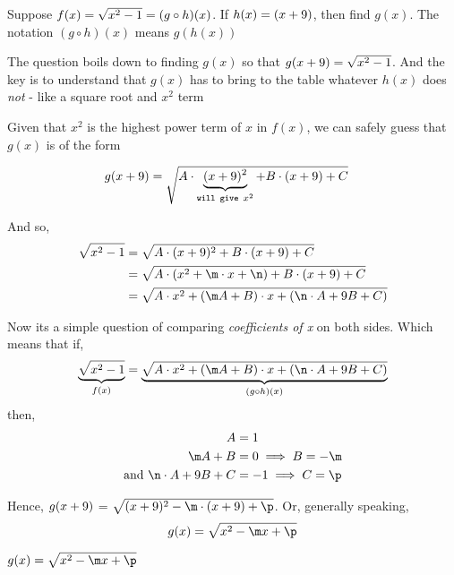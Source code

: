 



\SQUARE{\vb}{\n}
\EXPR[0]\p{-(\va - \n)}

\question[4] Suppose $f(x) = \sqrt{x^2 - 1} = (g \circ h)(x)$. If $h(x) = (x + 9)$, 
then find $g(x)$. The notation $(g\circ h)(x)$ means $g(h(x))$


\watchout

\ifprintanswers
\fi 

\begin{solution}[\halfpage]
	The question boils down to finding $g(x)$ so that $g(x+9) = \sqrt{x^2-1}$. And the key 
	is to understand that $g(x)$ has to bring to the table whatever $h(x)$ does \textit{not} - like 
	a square root and $x^2$ term 
	
	Given that $x^2$ is the highest power term of $x$ in $f(x)$, we can safely guess that 
	$g(x)$ is of the form 
	
	\begin{align}
		g(x + 9) &= \sqrt{A\cdot\underbrace{(x + 9)^2}_{\texttt{will give } x^2} 
		+ B\cdot(x + 9) + C}
	\end{align}			
	
	
	And so,
	\begin{align}
		\sqrt{x^2 - \va} &= \sqrt{A\cdot(x + \vb)^2 + B\cdot(x + \vb) + C} \\ 
		 &= \sqrt{A\cdot(x^2 + \m\cdot x + \n) + B\cdot(x + \vb) + C} \\
		 &= \sqrt{A\cdot x^2 + (\m A + B)\cdot x + (\n\cdot A + \vb B + C)}
	\end{align}
	
	Now its a simple question of comparing \textit{coefficients of x} on both sides. 
	Which means that if,
  \[ \underbrace{\sqrt{x^2 - \va}}_{f(x)} = 
		\underbrace{\sqrt{A\cdot x^2 + (\m A + B)\cdot x + (\n\cdot A + \vb B + C)}}_{(g\circ h)(x)} \]
  then, 
	\begin{align}
    A &= 1 \\
		\m A + B &= 0 \implies B = -\m \\
		\text{and } \n\cdot A + \vb B + C &= -\va \implies C = \p
	\end{align}
	
	Hence, $g(x + 9)$ = $\sqrt{(x+\vb)^2 -\m\cdot(x + \vb) + \p}$. Or, generally speaking, 
	\[g(x) = \sqrt{x^2 - \m x + \p} \]
	
\end{solution}

\ifprintanswers\begin{codex}
	$g(x) = \sqrt{x^2 - \m x + \p}$
\end{codex}\fi
